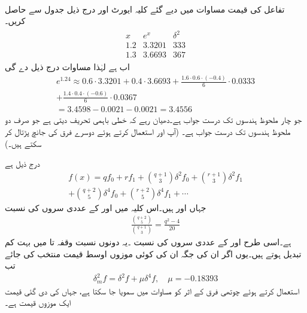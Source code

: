 \quad {}\\
تفاعل  کی قیمت مساوات  میں دیے گئے کلیہ ایورٹ اور درج ذیل جدول سے حاصل کریں۔
\begin{align*}
\begin{array}{c|cc}
x&e^x&\delta^2\\
\hline
1.2&3.3201&333\\
1.3&3.6693&367
\end{array}
\end{align*}
اب  ہے  لہٰذا مساوات  درج ذیل دے گی
\begin{multline*}
e^{1.24}\approx 0.6\cdot 3.3201+0.4\cdot 3.6693+\frac{1.6\cdot 0.6\cdot(-0.4)}{6}\cdot 0.0333\\
+\frac{1.4\cdot 0.4\cdot(-0.6)}{6}\cdot 0.0367\\
=3.4598-0.0021-0.0021=3.4556
\end{multline*}
جو چار ملحوظ ہندسوں تک درست جواب ہے۔دھیان رہے کہ خطی باہمی تحریف  دیتی ہے جو صرف دو ملحوظ ہندسوں تک درست جواب ہے۔ (آپ  اور  استعمال کرتے ہوئے دوسرے فرق کی جانچ پڑتال کر سکتے ہیں۔)

 درج ذیل ہے
\begin{multline}
f(x)=qf_0+rf_1+\binom{q+1}{3}\delta^2 f_0+\binom{r+1}{3}\delta^2 f_1\\
+\binom{q+2}{5}\delta^4 f_0+\binom{r+2}{5}\delta^4 f_1+\cdots
\end{multline}
جہاں  اور  ہیں۔اس کلیہ میں  اور  کے عددی سروں کی نسبت
\begin{align*}
\frac{\binom{q+2}{5}}{\binom{q+1}{3}}=\frac{q^2-4}{20}
\end{align*}
ہے۔اسی طرح  اور  کے عددی سروں کی نسبت ۔یہ دونوں نسبت وقفہ  تا  میں بہت کم تبدیل ہوتے ہیں۔یوں اگر ان کی جگہ ان کی کوئی موزوں اوسط قیمت  منتخب کی جائے  تب 
\begin{align}
\delta_m^2f=\delta^2f+\mu\delta^4f,\quad \mu=-0.18393
\end{align}
 استعمال کرتے ہوئے  چوتھی فرق کے اثر کو مساوات  میں سمویا جا سکتا ہے، جہاں  کی دی گئی قیمت ایک موزوں قیمت ہے۔

